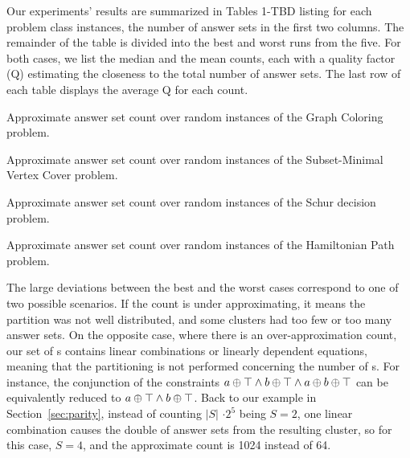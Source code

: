 Our experiments' results are summarized in Tables 1-TBD listing for each problem class instances, the number of answer sets in the first two columns.
The remainder of the table is divided into the best and worst runs from the five. 
%
For both cases, we list the median and the mean counts, each with a quality factor (Q) estimating the closeness to the total number of answer sets.
The last row of each table displays the average Q for each count.

\begin{table*}[t]
  \centering
  
  \caption{Approximate answer set count over random instances of the Graph Coloring problem.}\label{table:graph_color}
\end{table*}


\begin{table*}[t]
  \centering
  
  \caption{Approximate answer set count over random instances of the Subset-Minimal Vertex Cover problem.}\label{table:min_vertex_cover}
\end{table*}

\begin{table*}[t]
  \centering
  
  \caption{Approximate answer set count over random instances of the Schur decision problem.}\label{table:schur}
\end{table*}


\begin{table*}[t]
  \centering
  
  \caption{Approximate answer set count over random instances of the Hamiltonian Path problem.}\label{table:hampath}
\end{table*}




The large deviations between the best and the worst cases correspond to one of two possible scenarios.
%
If the count is under approximating,
it means the partition was not well distributed, and some clusters had too few or too many answer sets. 
%
On the opposite case, where there is an over-approximation count,
our set of \XOR{}s contains linear combinations or linearly dependent equations,
meaning that the partitioning is not performed concerning the number of \XOR{}s.
% 
For instance, the conjunction of the \XOR{} constraints $a \oplus \top \land b \oplus \top \land a \oplus b \oplus \top$ can be equivalently reduced to $a \oplus \top \land b \oplus \top$. 
%
Back to our example in Section~\ref{sec:parity}, instead of counting $|S|$ $\cdot 2^5$ being $S=2$,
one linear combination causes the double of answer sets from the resulting cluster, so for this case, $S=4$, and the approximate count is 1024 instead of 64. 



